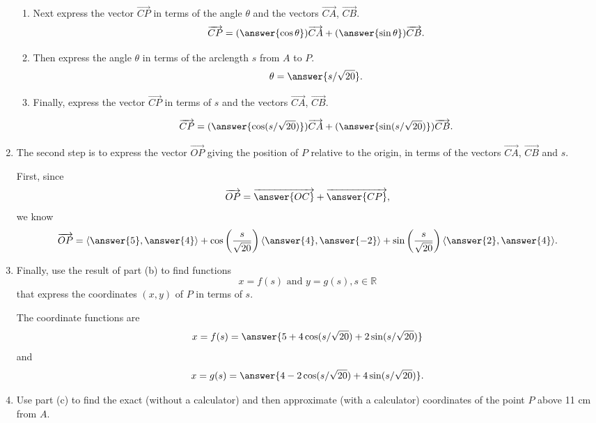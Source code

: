 \documentclass{ximera}
\begin{document}
\begin{question}
\begin{expandable}
\begin{enumerate}
\begin{enumerate}
\item Next express the vector $\overrightarrow{CP}$ in terms of the angle $\theta$ and the vectors $\overrightarrow{CA}$, $\overrightarrow{CB}$.
\[
       \overrightarrow{CP} = (\answer{\cos \theta}) \overrightarrow{CA} + (\answer{\sin \theta}) \overrightarrow{CB} .
\]

\item Then express the angle $\theta$ in terms of the arclength $s$ from $A$ to $P$.
\[
     \theta  =\answer{s/\sqrt{20}} .
\]

\item Finally, express  the vector $\overrightarrow{CP}$ in terms of $s$ and the vectors $\overrightarrow{CA}$, $\overrightarrow{CB}$.

\[
       \overrightarrow{CP} = (\answer{\cos (s/\sqrt{20})}) \overrightarrow{CA} + (\answer{\sin (s/\sqrt{20})}) \overrightarrow{CB} .
\]
\end{enumerate}

\item The second step is to express the vector  $\overrightarrow{OP}$ giving the position of $P$ relative to the origin, in terms of
the vectors $\overrightarrow{CA}$, $\overrightarrow{CB}$ and $s$.

First, since
\[
    \overrightarrow{OP} = \overrightarrow{\answer{OC}} + \overrightarrow{\answer{CP}},
\]
we know
\[
  \overrightarrow{OP} = \langle \answer{5}, \answer{4}\rangle +   \cos \left( \frac{s}{\sqrt{20}} \right) \langle \answer{4} , \answer{-2} \rangle + \sin \left( \frac{s}{\sqrt{20}} \right) \langle \answer{2} , \answer{4} \rangle .
\]

\item Finally, use the result of part (b) to find functions
\[
    x = f(s) \text{ and } y=g(s) , s\in \mathbb{R}
\]
that express the coordinates $(x,y)$ of $P$ in terms of $s$.

The coordinate functions are
\[
    x = f(s) = \answer{5 + 4\cos (s/\sqrt{20}) +2\sin (s/\sqrt{20}) }
\]
and
\[
  x = g(s) = \answer{4 - 2\cos (s/\sqrt{20}) +4\sin (s/\sqrt{20}) } .
\]

\item Use part (c) to find the exact (without a calculator) and then approximate (with a calculator) coordinates of the point $P$ above 11 cm from $A$. 
\end{enumerate}

\end{expandable}

\end{question}
\end{document}
